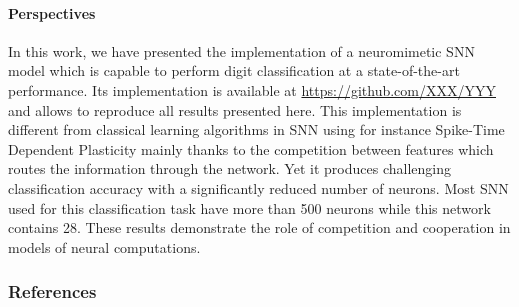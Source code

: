 \documentclass[12pt]{article}
\begin{document}
\paragraph*{Perspectives}
In this work, we have presented the implementation of a neuromimetic SNN model which is capable to perform digit classification at a state-of-the-art performance. Its implementation is available at \url{https://github.com/XXX/YYY} and allows to reproduce all results presented here. %
This implementation is different from classical learning algorithms in SNN using for instance Spike-Time Dependent Plasticity mainly thanks to the competition between features which routes the information through the network. Yet it produces challenging classification accuracy with a significantly reduced number of neurons. Most SNN used for this classification task have more than 500 neurons while this network contains 28. These results demonstrate the role of competition and cooperation in models of neural computations.
%


\subsubsection*{References}
  \vspace{-15pt}
{
\small
\begingroup
{}
\setlength\bibitemsep{1pt}
\printbibliography[heading=none]
\endgroup
}



\end{document}
